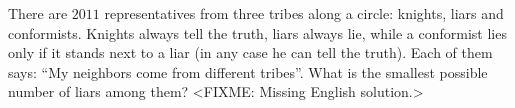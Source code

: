 \problem
There are $2011$ representatives from three tribes along a circle: knights,
liars and conformists.
Knights always tell the truth, liars always lie, while a conformist lies only
if it stands next to a liar (in any case he can tell the truth).
Each of them says: ``My neighbors come from different tribes''.
What is the smallest possible number of liars among them?
\solution
<FIXME: Missing English solution.>
\endproblem
